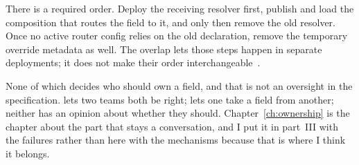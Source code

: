 %
There is a required order. Deploy the receiving resolver first, publish and
load the composition that routes the field to it, and only then remove the
old resolver. Once no active router config relies on the old declaration,
remove the temporary override metadata as well. The overlap lets those steps
happen in separate deployments; it does not make their order
interchangeable~\autocite{apollooverridemigrationrepair}.

%
None of which decides who should own a field, and that is not an oversight in
the specification.  lets two teams both be right;
 lets one take a field from another; neither has an opinion
about whether they should. Chapter~\ref{ch:ownership} is the chapter about the
part that stays a conversation, and I put it in part~III with the failures
rather than here with the mechanisms because that is where I think it belongs.
%
